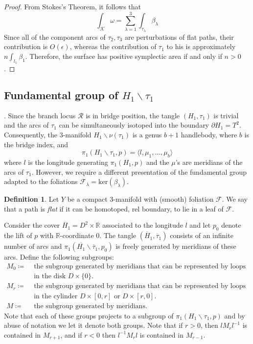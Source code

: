 \documentclass[11pt]{amsart}
\theoremstyle{definition}
\newtheorem{definition}[theorem]{Definition}
\theoremstyle{remark}
\numberwithin{equation}{section}
\newcommand{\cR}{\mathcal{R}}
\newcommand{\cF}{\mathcal{F}}
\newcommand{\cK}{\mathcal{K}}
\newcommand{\RR}{\mathbb{R}}
\newcommand{\del}{\partial}
\begin{document}
\begin{proof}
From Stokes's Theorem, it follows that
\[\int_{\cK} \omega = \sum_{\lambda = 1}^3 \int_{\tau_{\lambda}} \beta_{\lambda}\]
Since all of the component arcs of $\tau_2,\tau_3$ are perturbations of flat paths, their contribution is $O(\epsilon)$, whereas the contribution of $\tau_1$ to his is approximately $n \int_{l_1} \beta_1$.  Therefore, the surface has positive symplectic area if and only if $n > 0$.
\end{proof}

\subsection{Fundamental group of $H_1 \smallsetminus \tau_1$}.  Since the branch locus $\cR$ is in bridge position, the tangle $(H_1,\tau_1)$ is trivial and the arcs of $\tau_1$ can be simultaneously isotoped into the boundary $\del H_1 = T^2$.  Consequently, the 3-manifold $H_1 \smallsetminus \nu(\tau_1)$ is a genus $b + 1$ handlebody, where $b$ is the bridge index, and
\[\pi_1(H_1 \smallsetminus \tau_1,p) = \langle l,\mu_1,\dots,\mu_b\rangle \]
where $l$ is the longitude generating $\pi_1(H_1,p)$ and the $\mu$'s are meridians of the arcs of $\tau_1$.  However, we require a different presentation of the fundamental group adapted to the foliations $\cF_{\lambda} = \text{ker}(\beta_{\lambda})$.

\begin{definition}
Let $Y$ be a compact 3-manifold with (smooth) foliation $\cF$.  We say that a path is {\it flat} if it can be homotoped, rel boundary, to lie in a leaf of $\cF$.  
\end{definition}

Consider the cover $\overline{H}_1 = D^2 \times \RR$ associated to the longitude $l$ and let $p_0$ denote the lift of $p$ with $\RR$-coordinate 0.  The tangle $(\overline{H}_1,\overline{\tau}_1)$ consists of an infinite number of arcs and $\pi_1(\overline{H_1} \smallsetminus \overline{\tau}_1,p_0)$ is freely generated by meridians of these arcs.  Define the following subgroups:
\begin{align*}
M_0 \coloneqq & \text{ the subgroup generated by meridians that can be represented by loops } \\ & \text{ in the disk $D \times \{0\}$.} \\
M_r \coloneqq & \text{ the subgroup generated by meridians that can be represented by loops } \\ & \text{ in the cylinder $D \times [0,r]$ or $D \times [r,0]$.} \\
M \coloneqq & \text{ the subgroup generated by meridians.}
\end{align*}
Note that each of these groups projects to a subgroup of $\pi_1(H_1 \smallsetminus \tau_1,p)$ and by abuse of notation we let it denote both groups.  Note that if $r > 0$, then $lM_rl^{-1}$ is contained in $M_{r +1}$, and if $r < 0$ then $l^{-1}M_r l$ is contained in $M_{r - 1}$.
\end{document}
